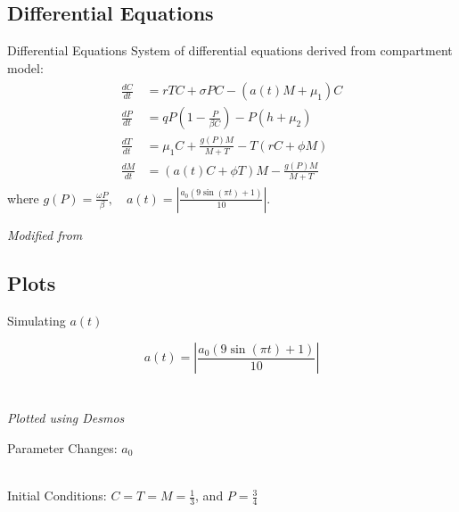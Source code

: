 \documentclass{beamer}
\begin{document}
\subsection{Differential Equations}
\begin{frame}{Differential Equations}
    System of differential equations derived from compartment model:
    \begin{align*}
        \begin{split}
            \frac{dC}{dt} &= rTC + \sigma PC- (a(t)M+\mu_{1})C\\
            \frac{dP}{dt} &= qP \left( 1-\frac{P}{\beta C} \right) - P \left( h+\mu_{2} \right)\\
            \frac{dT}{dt} &= \mu_{1}C + \frac{g(P)M}{M+T} - T(rC+\phi M)\\
            \frac{dM}{dt} &= (a(t)C+ \phi T)M - \frac{g(P)M}{M+T}
            \label{SoODE}
        \end{split}
    \end{align*}
    where $g(P) = \frac{\omega P}{\beta}, \quad a(t)=|\frac{a_{0}(9\sin{(\pi t) }+1)}{10}|$.\\ 
    \quad
    \begin{center}
        {\small \textit{Modified from \cite{13_blackwood_hastings_mumby_2010}}}
    \end{center}
\end{frame}

\subsection{Plots}
\begin{frame}{Simulating $a(t)$}
    \vspace{-1cm}
    \begin{center}
        $$a(t)= \left|\frac{a_{0}(9\sin{(\pi t) }+1)}{10} \right|$$\\
         \\
        \vspace{0.5cm}
        \textit{Plotted using Desmos}
    \end{center}
    
\end{frame}

\begin{frame}{Parameter Changes: $a_{0}$}
    \begin{center}
        \\
        Initial Conditions: $C = T = M = \frac{1}{3}$, and $P = \frac{3}{4}$
    \end{center}
\end{frame}
\end{document}
